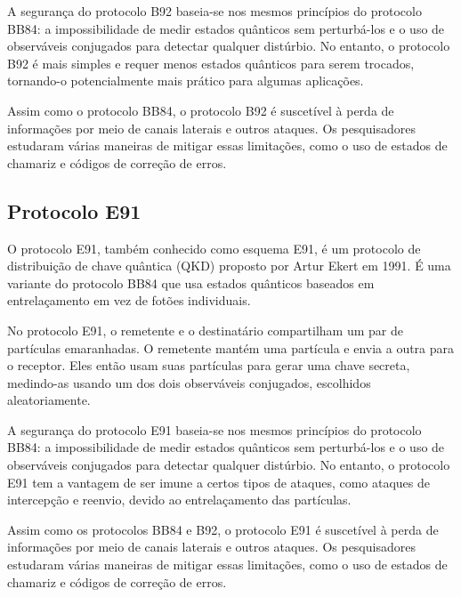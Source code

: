 A segurança do protocolo B92 baseia-se nos mesmos princípios do protocolo BB84: a impossibilidade de medir estados quânticos sem perturbá-los e o uso de observáveis conjugados para detectar qualquer distúrbio. No entanto, o protocolo B92 é mais simples e requer menos estados quânticos para serem trocados, tornando-o potencialmente mais prático para algumas aplicações.

Assim como o protocolo BB84, o protocolo B92 é suscetível à perda de informações por meio de canais laterais e outros ataques. Os pesquisadores estudaram várias maneiras de mitigar essas limitações, como o uso de estados de chamariz e códigos de correção de erros.

\newpage

\subsection{Protocolo E91}

O protocolo E91, também conhecido como esquema E91, é um protocolo de distribuição de chave quântica (QKD) proposto por Artur Ekert em 1991. É uma variante do protocolo BB84 que usa estados quânticos baseados em entrelaçamento em vez de fotões individuais.

No protocolo E91, o remetente e o destinatário compartilham um par de partículas emaranhadas. O remetente mantém uma partícula e envia a outra para o receptor. Eles então usam suas partículas para gerar uma chave secreta, medindo-as usando um dos dois observáveis conjugados, escolhidos aleatoriamente.

A segurança do protocolo E91 baseia-se nos mesmos princípios do protocolo BB84: a impossibilidade de medir estados quânticos sem perturbá-los e o uso de observáveis conjugados para detectar qualquer distúrbio. No entanto, o protocolo E91 tem a vantagem de ser imune a certos tipos de ataques, como ataques de intercepção e reenvio, devido ao entrelaçamento das partículas.

Assim como os protocolos BB84 e B92, o protocolo E91 é suscetível à perda de informações por meio de canais laterais e outros ataques. Os pesquisadores estudaram várias maneiras de mitigar essas limitações, como o uso de estados de chamariz e códigos de correção de erros.

